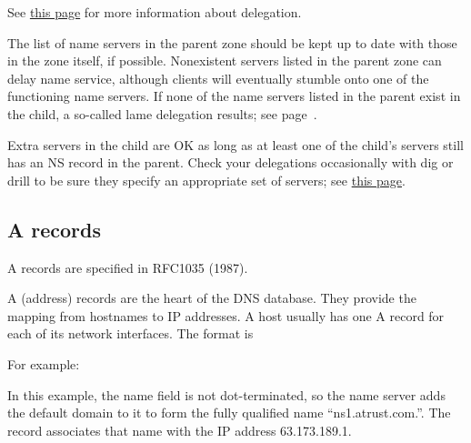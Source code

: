 \leavevmode\hypertarget{part0024_split_023.htmlux5cux23_idContainer940}{}%
See
\protect\hyperlink{part0024_split_015.htmlux5cux23_idTextAnchor859}{this
page} for more information about delegation.

The list of name servers in the parent zone should be kept up to date
with those in the zone itself, if possible. Nonexistent servers listed
in the parent zone can delay name service, although clients will
eventually stumble onto one of the functioning name servers. If none of
the name servers listed in the parent exist in the child, a so-called
lame delegation results; see page~\pageref{sec:lame-delegations}.

Extra servers in the child are OK as long as at least one of the child's
servers still has an NS record in the parent. Check your delegations
occasionally with {dig} or {drill} to be sure they specify an
appropriate set of servers; see
\protect\hyperlink{part0024_split_018.htmlux5cux23_idTextAnchor863}{this
page}.

\protect\hypertarget{part0024_split_024.html}{}{}

\hypertarget{part0024_split_024.htmlux5cux23_idContainer1069}{}
\hypertarget{part0024_split_024.htmlux5cux23calibre_pb_23}{%
\subsection[A
records]{\texorpdfstring{\protect\hypertarget{part0024_split_024.htmlux5cux23_idTextAnchor875}{}{}\protect\hypertarget{part0024_split_024.htmlux5cux23_idIndexMarker2072}{}{}\protect\hypertarget{part0024_split_024.htmlux5cux23_idIndexMarker2073}{}{}A
records}{A records}}\label{part0024_split_024.htmlux5cux23calibre_pb_23}}

\leavevmode\hypertarget{part0024_split_024.htmlux5cux23_idContainer941}{}%
A records are specified in RFC1035 (1987).

\protect\hypertarget{part0024_split_024.htmlux5cux23_idIndexMarker2074}{}{}A
(address) records are the heart of the DNS database. They provide the
mapping from hostnames to IP addresses. A host usually has one A record
for each of its network interfaces. The format is


For example:


In this example, the {name} field is not dot-terminated, so the name
server adds the default domain to it to form the fully qualified name
``ns1.atrust.com.''. The record associates that name with the IP address
63.173.189.1.

